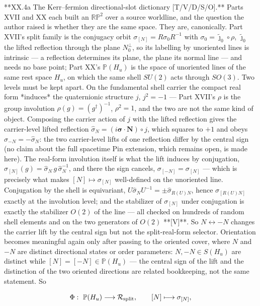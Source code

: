 **XX.4a The Kerr–fermion directional-slot dictionary [T/V/D/S/O].** Parts XVII and XX each built an $\mathbb{RP}^2$ over a source worldline, and the question the author raised is whether they are the same space. They are, canonically. Part XVII's split family is the conjugacy orbit $\sigma_{[N]} = R\sigma_0R^{-1}$ with $\sigma_0 = \tilde\jmath_0\circ\rho$, $\tilde\jmath_0$ the lifted reflection through the plane $N_0^\perp$, so its labelling by unoriented lines is intrinsic — a reflection determines its plane, the plane its normal line — and needs no base point; Part XX's $\mathbb P(H_u)$ is the space of unoriented lines of the same rest space $H_u$, on which the same shell $SU(2)$ acts through $SO(3)$. Two levels must be kept apart. On the fundamental shell carrier the compact real form *induces* the quaternionic structure $j$, $j^2 = -1$ — Part XVII's $\rho$ is the group involution $\rho(g) = (g^\dagger)^{-1}$, $\rho^2 = 1$, and the two are not the same kind of object. Composing the carrier action of $j$ with the lifted reflection gives the carrier-level lifted reflection $\hat\sigma_N = (i\boldsymbol\sigma\cdot\mathbf N)\circ j$, which squares to $+1$ and obeys $\hat\sigma_{-N} = -\hat\sigma_N$: the two carrier-level lifts of one reflection differ by the central sign (no claim about the full spacetime Pin extension, which remains open, is made here). The real-form involution itself is what the lift induces by conjugation, $\sigma_{[N]}(g) = \hat\sigma_N\,g\,\hat\sigma_N^{-1}$, and there the sign cancels, $\sigma_{[-N]} = \sigma_{[N]}$ — which is precisely what makes $[N]\mapsto\sigma_{[N]}$ well-defined on the unoriented line. Conjugation by the shell is equivariant, $U\hat\sigma_NU^{-1} = \pm\hat\sigma_{R(U)N}$, hence $\sigma_{[R(U)N]}$ exactly at the involution level; and the stabilizer of $\sigma_{[N]}$ under conjugation is exactly the stabilizer $O(2)$ of the line — all checked on hundreds of random shell elements and on the two generators of $O(2)$ **[V]**. So $N\leftrightarrow-N$ changes the carrier lift by the central sign but not the split-real-form selector. Orientation becomes meaningful again only after passing to the oriented cover, where $N$ and $-N$ are distinct directional states or order parameters: $N,-N\in S(H_u)$ are distinct while $[N] = [-N]\in\mathbb P(H_u)$ — the central sign of the lift and the distinction of the two oriented directions are related bookkeeping, not the same statement. So

$$\Phi:\ \mathbb P(H_u)\longrightarrow\mathcal R_{\rm split},\qquad [N]\longmapsto\sigma_{[N]},$$

